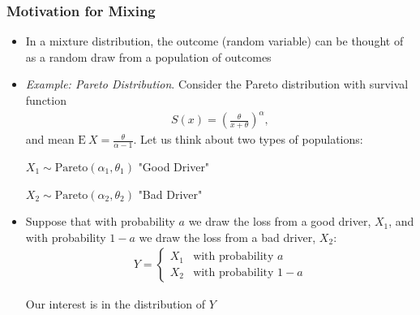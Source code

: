 \documentclass{beamer}
\begin{document}
\begin{frame}[shrink=2]
\frametitle{Motivation for Mixing}
\begin{itemize}
\item In a mixture distribution,  the outcome (random variable) can be thought of as a random draw from a population of
outcomes \vspace{2mm}

\item \textit{Example: Pareto Distribution}. Consider the Pareto distribution with survival function
\begin{eqnarray*}
S(x) = \left(\frac{\theta}{x+\theta}\right)^\alpha,
\end{eqnarray*}
and mean $ \mathrm{E~}X = \frac{\theta}{\alpha-1}$. Let us think
about two types of populations: \vspace{2mm}

$X_1 \sim \text{Pareto} (\alpha_1, \theta_1)$ "Good Driver"

$X_2 \sim \text{Pareto} (\alpha_2, \theta_2)$ "Bad Driver"
\vspace{2mm}

\item Suppose that with probability $a$ we draw the loss from a good driver, $X_1$, and with probability $1-a$ we draw the loss from a bad driver,
$X_2$:
\begin{eqnarray*}
Y =
\begin{cases}
X_1 & \text{with probability~} a\\
X_2 &  \text{with probability~} 1-a
\end{cases}
\end{eqnarray*} \vspace{2mm}

Our interest is in the distribution of $Y$
\end{itemize}
\end{frame}
\end{document}
